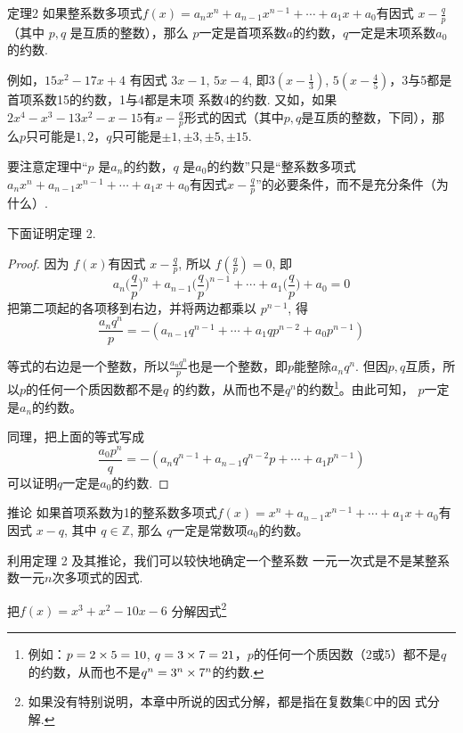 \begin{thm}
    {定理2} 如果整系数多项式$f(x)=a_nx^n+a_{n-1}x^{n-1}+\cdots+a_{1}x+a_{0}$有因式 $x-\frac qp$（其中 $p,q$ 是互质的整数），那么 $p$一定是首项系数$a$的约数，$q$一定是末项系数$a_0$的约数.
\end{thm}

例如，$15x^2-17x+4$ 有因式 $3x-1$, $5x-4$, 即$3\left(x-\frac{1}{3}\right)$, $5\left(x-\frac{4}{5}\right)$，3与5都是首项系数15的约数，1与4都是末项
系数4的约数. 又如，如果$2x^4-x^3-13x^2-x-15$有$x-\frac qp$形式的因式（其中$p,q$是互质的整数，下同），那么$p$只可能是$1,2$，$q$只可能是$\pm1,\pm3,\pm5,\pm15$.

要注意定理中“$p$ 是$a_n$的约数，$q$ 是$a_0$的约数”只是“整系数多项式$a_nx^n+a_{n-1}x^{n-1}+\cdots+a_1x+a_0$有因式$x-\frac qp$”的必要条件，而不是充分条件（为什么）.

下面证明定理 2.

\begin{proof}
因为 $f(x)$有因式 $x-\frac qp$, 所以 $f\left(\frac qp\right)=0$, 即
$$a_{n}\Big(\frac{q}{p}\Big)^{n}+a_{n-1}\Big(\frac{q}{p}\Big)^{n-1}+\cdots+a_{1}\Big(\frac{q}{p}\Big)+a_{0}=0$$
把第二项起的各项移到右边，并将两边都乘以 $p^{n-1}$, 得
$$\frac{a_nq^n}p=-(a_{n-1}q^{n-1}+\cdots+a_1qp^{n-2}+a_0p^{n-1})$$

等式的右边是一个整数，所以$\frac{a_nq^n}p$也是一个整数，即$p$能整除$a_nq^n$. 但因$p,q$互质，所以$p$的任何一个质因数都不是$q$ 的约数，从而也不是$q^{n}$的约数\footnote{例如：$p=2\times 5=10$, $q=3\times 7=21$，$p$的任何一个质因数（2或5）都不是$q$的约数，从而也不是$q^n=3^n\times 7^n$的约数.}。由此可知，
$p$一定是$a_n$的约数。

同理，把上面的等式写成
$$\frac{a_{0}p^{n}}{q}=-\left(a_{n}q^{n-1}+a_{n-1}q^{n-2}p+\cdots+a_{1}p^{n-1}\right)$$
可以证明$q$一定是$a_0$的约数.
\end{proof}

\begin{thm}
    {推论} 如果首项系数为1的整系数多项式$f(x)=x^{n}+ a_{n-1}x^{n-1}+\cdots+a_1x+a_0$有因式 $x-q$, 其中 $q\in\mathbb{Z}$, 那么 $q$一定是常数项$a_0$的约数。
\end{thm}

利用定理 2 及其推论，我们可以较快地确定一个整系数
一元一次式是不是某整系数一元$n$次多项式的因式.

\begin{example}
    把$f(x)=x^3+x^2-10x-6$ 分解因式\footnote{如果没有特别说明，本章中所说的因式分解，都是指在复数集$\mathbb{C}$中的因
    式分解.}
\end{example}

